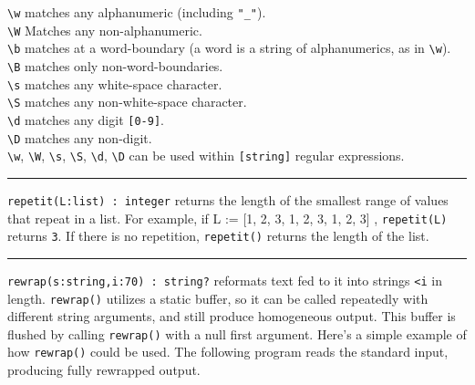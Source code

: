 \texttt{{\textbackslash}w} matches any alphanumeric (including
\texttt{"\_"}).\\
\texttt{{\textbackslash}W} Matches any non-alphanumeric.\\
\texttt{{\textbackslash}b} matches at a word-boundary (a word is
a string of alphanumerics, as in \texttt{{\textbackslash}w}).\\
\texttt{{\textbackslash}B} matches only non-word-boundaries.\\
\texttt{{\textbackslash}s} matches any white-space character.\\
\texttt{{\textbackslash}S} matches any non-white-space
character.\\
\texttt{{\textbackslash}d} matches any digit \texttt{[0-9]}.\\
\texttt{{\textbackslash}D} matches any non-digit.\\
\texttt{{\textbackslash}w}, \texttt{{\textbackslash}W},
\texttt{{\textbackslash}s}, \texttt{{\textbackslash}S},
\texttt{{\textbackslash}d}, \texttt{{\textbackslash}D} can be used
within \texttt{[string]} regular expressions.

\vspace{0.25cm}\hrule{}

\texttt{repetit(L:list) : integer} returns the length of the smallest
range of values that repeat in a list. For example, if L := [1, 2, 3,
1, 2, 3, 1, 2, 3] , \texttt{repetit(L)} returns \texttt{3}. If there is
no repetition, \texttt{repetit()} returns the length of the list. 

\pagebreak

\vspace{0.25cm}\hrule{}

\texttt{rewrap(s:string,i:70) : string?} reformats text fed to it into
strings \texttt{{\textless}i} in length. \texttt{rewrap()} utilizes a
static buffer, so it can be called repeatedly with different string
arguments, and still produce homogeneous output. This buffer is flushed
by calling \texttt{rewrap()} with a null first argument.
Here's a simple example of how \texttt{rewrap()} could
be used. The following program reads the standard input, producing
fully rewrapped output.


